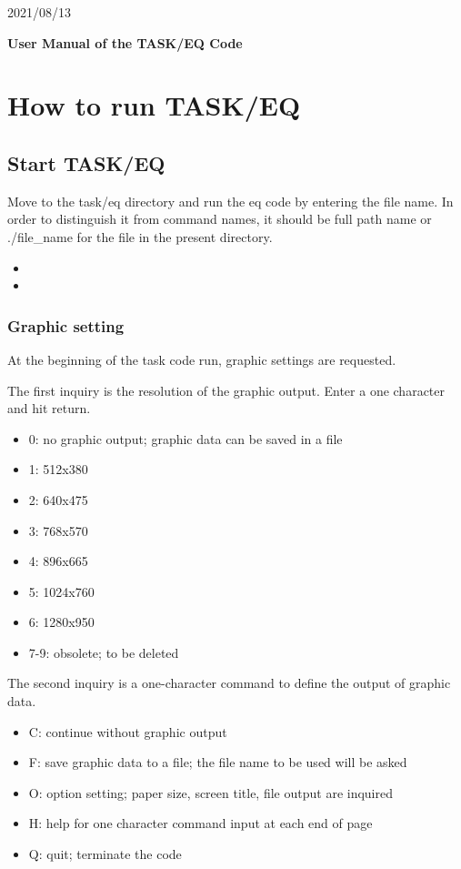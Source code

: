 \documentclass[11pt]{article}
\begin{document}
\begin{flushright}
2021/08/13
\end{flushright}

\begin{center}
\textbf{\Large User Manual of the TASK/EQ Code}
\end{center}

\tableofcontents

\section{How to run TASK/EQ}

\subsection{Start TASK/EQ}

Move to the task/eq directory and run the eq code by entering the file
name.  In order to distinguish it from command names, it should be
full path name or ./file\_name for the file in the present directory.
\begin{itemize}
\item[\qquad]
\item[\qquad]
\end{itemize}

\subsubsection{Graphic setting}

At the beginning of the task code run, graphic settings are requested.

The first inquiry is the resolution of the graphic output. Enter a one
character and hit return.
\begin{itemize}
\item[]
0: no graphic output; graphic data can be saved in a file
\item[]
1: 512x380
\item[]
2: 640x475
\item[]
3: 768x570
\item[]
4: 896x665
\item[]
5: 1024x760
\item[]
6: 1280x950
\item[]
7-9: obsolete; to be deleted
\end{itemize}

The second inquiry is a one-character command to define the output of
graphic data.
\begin{itemize}
\item[]
C: continue without graphic output
\item[]
F: save graphic data to a file; the file name to be used will be asked
\item[]
O: option setting; paper size, screen title, file output are
inquired
\item[]
H: help for one character command input at each end of page
\item[]
Q: quit; terminate the code
\end{itemize}
\end{document}
